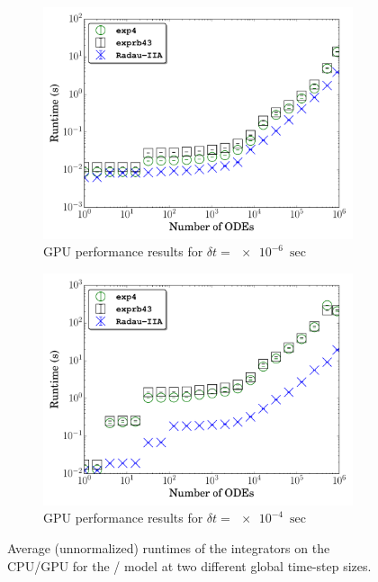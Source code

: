 \documentclass[final,twocolumn]{elsarticle}
\begin{document}
\begin{figure}[htb]
\begin{subfigure}{0.49\textwidth}
  \end{subfigure}\\
  \begin{subfigure}{0.49\textwidth}
      \includegraphics[width=\linewidth]{H2_1e-06_gpu_nonorm.pdf}
      \caption{GPU performance results for $\delta t = \SI{e-6}{\sec}$}
  \end{subfigure}
  \begin{subfigure}{0.49\textwidth}
      \includegraphics[width=\linewidth]{H2_1e-04_gpu_nonorm.pdf}
      \caption{GPU performance results for $\delta t = \SI{e-4}{\sec}$}
  \end{subfigure}
  \caption{Average (unnormalized) runtimes of the integrators on the CPU\slash GPU for the \slash{} model at two different global time-step sizes.}
\end{figure}
\end{document}
